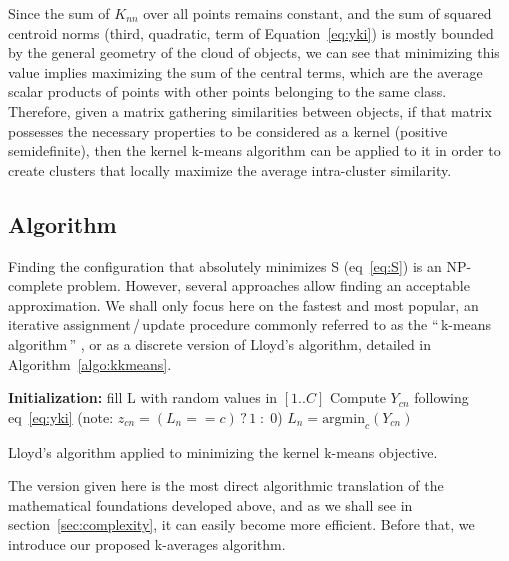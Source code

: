 \documentclass[natbib,smallextended]{svjour3}
\newcommand{\gl}[1]{``\,#1\,''} %
\begin{document}

Since the sum of $K_{nn}$ over all points remains constant, and the sum of squared centroid norms (third, quadratic, term of Equation~\ref{eq:yki}) is mostly bounded by the general geometry of the cloud of objects, we can see that minimizing this value implies maximizing the sum of the central terms, which are the average scalar products of points with other points belonging to the same class. Therefore, given a matrix gathering similarities between objects, if that matrix possesses the necessary properties to be considered as a kernel (positive semidefinite), then the kernel k-means algorithm can be applied to it in order to create clusters that locally maximize the average intra-cluster similarity.

\subsection{Algorithm}

Finding the configuration that absolutely minimizes S (eq~\ref{eq:S}) is an NP-complete problem. However, several approaches allow finding an acceptable approximation. We shall only focus here on the fastest and most popular, an iterative assignment\,/\,update procedure commonly referred to as the \gl{k-means algorithm} \citep{macQueenBsmsp67}, or as a discrete version of Lloyd's algorithm, detailed in Algorithm~\ref{algo:kkmeans}.

\begin{algorithm}
	\label{algo:kkmeans}
	\SetAlgoLined
	\BlankLine
	\textbf{Initialization:} fill L with random values in $[1..C]$\;
	\BlankLine
	 {
		 {
			 {
				Compute $Y_{cn}$ following eq~\ref{eq:yki} \label{algline:kkmeans_cplx1}
				(note: $z_{cn} = (L_n == c)\,?\,1\;:\;0$)
			}
			$L_n = \textrm{argmin}_c (Y_{cn})$\;
		}
	}
	\BlankLine
	\caption{Lloyd's algorithm applied to minimizing the kernel k-means objective.}
\end{algorithm}

The version given here is the most direct algorithmic translation of the mathematical foundations developed above, and as we shall see in section~\ref{sec:complexity}, it can easily become more efficient. Before that, we introduce our proposed k-averages algorithm.
\end{document}
